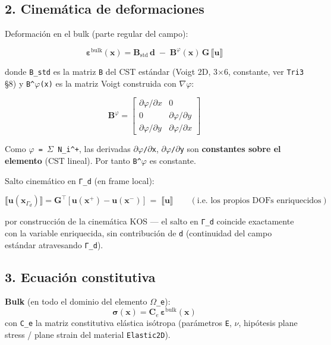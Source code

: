 \documentclass[11pt,letterpaper,oneside]{report}
\begin{document}
\subsection{2. Cinemática de deformaciones}

Deformación en el bulk (parte regular del campo):

\[
\boldsymbol\varepsilon^{\text{bulk}}(\mathbf x) = \mathbf B_{\text{std}}\,\mathbf d \;-\; \mathbf B^\varphi(\mathbf x)\,\mathbf G\,\llbracket\mathbf u\rrbracket
\]

donde \texttt{B\_std} es la matriz \texttt{B} del CST estándar (Voigt 2D, 3\ensuremath{\times}6, constante, ver \texttt{Tri3} §8) y \texttt{B\textasciicircum{}\ensuremath{\varphi}(x)} es la matriz Voigt construida con \texttt{\ensuremath{\nabla}\ensuremath{\varphi}}:

\[
\mathbf B^\varphi = \begin{bmatrix} \partial\varphi/\partial x & 0 \\ 0 & \partial\varphi/\partial y \\ \partial\varphi/\partial y & \partial\varphi/\partial x \end{bmatrix}
\]

Como \texttt{\ensuremath{\varphi} = \ensuremath{\Sigma} N\_i\textasciicircum{}+}, las derivadas \texttt{\ensuremath{\partial}\ensuremath{\varphi}/\ensuremath{\partial}x}, \texttt{\ensuremath{\partial}\ensuremath{\varphi}/\ensuremath{\partial}y} son \textbf{constantes sobre el elemento} (CST lineal). Por tanto \texttt{B\textasciicircum{}\ensuremath{\varphi}} es constante.

Salto cinemático en \texttt{Γ\_d} (en frame local):

\[
\llbracket\mathbf u(\mathbf x_{\Gamma_d})\rrbracket = \mathbf G^\top\,\bigl[\,\mathbf u(\mathbf x^+) - \mathbf u(\mathbf x^-)\,\bigr] \;=\; \llbracket\mathbf u\rrbracket \qquad (\text{i.e. los propios DOFs enriquecidos})
\]

por construcción de la cinemática KOS --- el salto en \texttt{Γ\_d} coincide exactamente con la variable enriquecida, sin contribución de \texttt{d} (continuidad del campo estándar atravesando \texttt{Γ\_d}).

\subsection{3. Ecuación constitutiva}

\textbf{Bulk} (en todo el dominio del elemento \texttt{\ensuremath{\Omega}\_e}):
\[
\boldsymbol\sigma(\mathbf x) = \mathbf C_e \,\boldsymbol\varepsilon^{\text{bulk}}(\mathbf x)
\]
con \texttt{C\_e} la matriz constitutiva elástica isótropa (parámetros \texttt{E}, \texttt{\ensuremath{\nu}}, hipótesis plane stress / plane strain del material \texttt{Elastic2D}).
\end{document}
